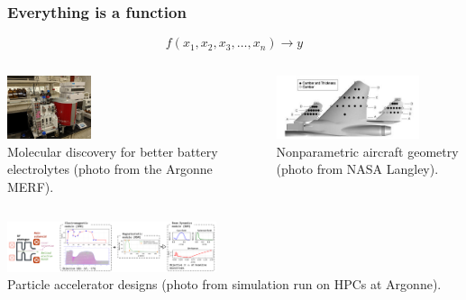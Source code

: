 \documentclass[aspectratio=169]{beamer}
\begin{document}
\begin{frame}\frametitle{Everything is a function}

{\large
$$
f(x_1, x_2, x_3, \ldots, x_n) \rightarrow y
$$
}

\pause
\bigskip

\begin{columns}
\begin{column}{0.5\textwidth}
\begin{center}
\includegraphics[height=5em]{../img/probs/cfr-nmr-setup.jpg}\\
{\small
Molecular discovery for better battery electrolytes
(photo from the Argonne MERF).\\
}
\end{center}
\end{column}

\pause

\begin{column}{0.5\textwidth}
\begin{center}
\includegraphics[height=5em]{../img/probs/nasa-f15.png}\\
{\small
Nonparametric aircraft geometry (photo from NASA Langley).\\
}
\end{center}
\end{column}
\end{columns}

\pause

\begin{center}
\includegraphics[height=4em]{../img/moo_new/accelerator_design.png}\\
{\small
Particle accelerator designs (photo from simulation run on HPCs at Argonne).\\
}
\end{center}

\end{frame}
\end{document}

